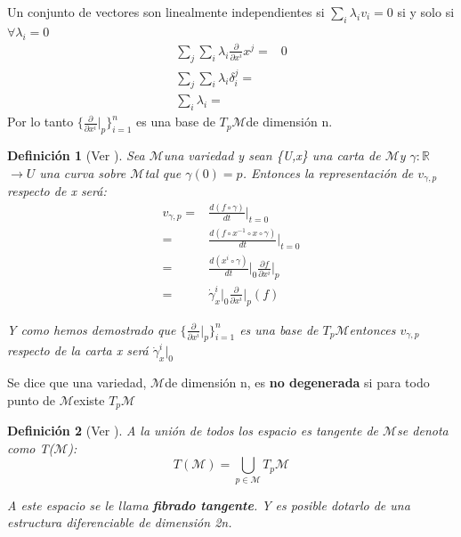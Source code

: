 \documentclass[pdftex,11pt,a4paper]{book}
\newtheorem{defi}{Definici\'on}
\newcommand{\eproof}{\hfill\qedsymbol}
\newcommand{\M}{$\mathscr{M}$}
\newcommand{\tpm}{$T_p\mathscr{M}$}
\newcommand{\R}{$\mathbb{R}$}
\begin{document}
Un conjunto de vectores son linealmente independientes si $\sum_i \lambda_i v_i = 0$ si y solo si $\forall \lambda_i = 0$
\begin{equation}
\begin{aligned}
    \sum_j \sum_i \lambda_i \frac{\partial}{\partial x^i} x^j = &0\\
\sum_j \sum_i \lambda_i \delta_i^j =&\\
\sum_i \lambda_i =&
\end{aligned}
\end{equation}
Por lo tanto $\lbrace \frac{\partial}{\partial x^i}\bigg|_p \rbrace_{i = 1}^n$ es una base de \tpm de dimensión n.
\eproof

\begin{defi}[Ver \cite{gondinho}]
Sea \M una variedad y sean \{U,x\} una carta de \M y $\gamma:$\R$\to U$ una curva sobre \M tal que $\gamma(0)=p$. Entonces la representación de $v_{\gamma,p}$ respecto de x será:
\begin{equation}
    \begin{aligned}
           v_{\gamma,p}=&  \frac{d(f \circ \gamma)}{dt}\bigg|_{t=0}\\
           =&\frac{d(f \circ x^{-1} \circ x \circ \gamma)}{dt}\bigg|_{t=0}\\
           =& \frac{d(x^i \circ \gamma)}{dt}\bigg|_{0} \frac{\partial f}{\partial x^i}\bigg|_{p}\\
            =& \dot{\gamma}_x^i\bigg|_0\frac{\partial }{\partial x^i}\bigg|_{p} (f)  
  \end{aligned}
\end{equation}
 
Y como hemos demostrado que $\lbrace \frac{\partial}{\partial x^i}\bigg|_p \rbrace_{i = 1}^n$ es una base de \tpm entonces $v_{\gamma,p}$ respecto de la carta x será $ \dot{\gamma}_x^i\bigg|_0 $
\end{defi}


Se dice que una variedad, \M de dimensión n, es \textbf{no degenerada} si para todo punto de \M  existe \tpm 

\begin{defi}[Ver \cite{gondinho}]
A la unión de todos los espacio es tangente de \M  se denota como T(\M): 
\begin{equation}
T(\mathscr{M})= \bigcup_{p \in \mathscr{M}} T_p \mathscr{M}
\end{equation}

A este espacio se le llama \textbf{fibrado tangente}. Y es posible dotarlo de una estructura diferenciable de dimensión 2n.

\end{defi}
\end{document}

